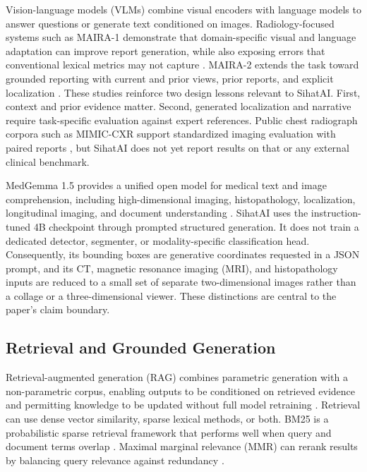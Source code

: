 \documentclass[conference]{IEEEtran}
\begin{document}
Vision-language models (VLMs) combine visual encoders with language models to answer questions or generate text conditioned on images. Radiology-focused systems such as MAIRA-1 demonstrate that domain-specific visual and language adaptation can improve report generation, while also exposing errors that conventional lexical metrics may not capture \cite{bannur2024maira1}. MAIRA-2 extends the task toward grounded reporting with current and prior views, prior reports, and explicit localization \cite{bannur2024maira2}. These studies reinforce two design lessons relevant to SihatAI. First, context and prior evidence matter. Second, generated localization and narrative require task-specific evaluation against expert references. Public chest radiograph corpora such as MIMIC-CXR support standardized imaging evaluation with paired reports \cite{johnson2019mimiccxr}, but SihatAI does not yet report results on that or any external clinical benchmark.

MedGemma 1.5 provides a unified open model for medical text and image comprehension, including high-dimensional imaging, histopathology, localization, longitudinal imaging, and document understanding \cite{sellergren2026medgemma,googlemedgemmacard}. SihatAI uses the instruction-tuned 4B checkpoint through prompted structured generation. It does not train a dedicated detector, segmenter, or modality-specific classification head. Consequently, its bounding boxes are generative coordinates requested in a JSON prompt, and its CT, magnetic resonance imaging (MRI), and histopathology inputs are reduced to a small set of separate two-dimensional images rather than a collage or a three-dimensional viewer. These distinctions are central to the paper's claim boundary.

\subsection{Retrieval and Grounded Generation}

Retrieval-augmented generation (RAG) combines parametric generation with a non-parametric corpus, enabling outputs to be conditioned on retrieved evidence and permitting knowledge to be updated without full model retraining \cite{lewis2020rag}. Retrieval can use dense vector similarity, sparse lexical methods, or both. BM25 is a probabilistic sparse retrieval framework that performs well when query and document terms overlap \cite{robertson2009bm25}. Maximal marginal relevance (MMR) can rerank results by balancing query relevance against redundancy \cite{carbonell1998mmr}.
\end{document}
